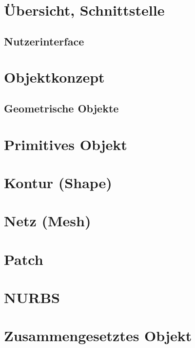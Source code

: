 
\section{Übersicht, Schnittstelle}
\subsection{Nutzerinterface}
\section{Objektkonzept}
\subsection{Geometrische Objekte}

\section{Primitives Objekt}

\section{Kontur (Shape)}

\section{Netz (Mesh)}

\section{Patch}

\section{NURBS}

\section{Zusammengesetztes Objekt}

